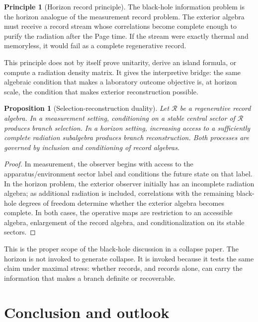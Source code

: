 \documentclass[11pt]{article}
\numberwithin{equation}{section}
\newtheorem{proposition}[theorem]{Proposition}
\theoremstyle{definition}
\newtheorem{principle}[theorem]{Principle}
\theoremstyle{remark}
\newcommand{\Ralg}{\mathcal R}
\begin{document}
\begin{principle}[Horizon record principle]
\label{principle:horizon-record}
The black-hole information problem is the horizon analogue of the measurement record problem.  The exterior algebra must receive a record stream whose correlations become complete enough to purify the radiation after the Page time.  If the stream were exactly thermal and memoryless, it would fail as a complete regenerative record.
\end{principle}

This principle does not by itself prove unitarity, derive an island formula, or compute a radiation density matrix.  It gives the interpretive bridge: the same algebraic condition that makes a laboratory outcome objective is, at horizon scale, the condition that makes exterior reconstruction possible.

\begin{proposition}[Selection-reconstruction duality]
\label{prop:selection-reconstruction}
Let \(\Ralg\) be a regenerative record algebra.  In a measurement setting, conditioning on a stable central sector of \(\Ralg\) produces branch selection.  In a horizon setting, increasing access to a sufficiently complete radiation subalgebra produces branch reconstruction.  Both processes are governed by inclusion and conditioning of record algebras.
\end{proposition}

\begin{proof}
In measurement, the observer begins with access to the apparatus/environment sector label and conditions the future state on that label.  In the horizon problem, the exterior observer initially has an incomplete radiation algebra; as additional radiation is included, correlations with the remaining black-hole degrees of freedom determine whether the exterior algebra becomes complete.  In both cases, the operative maps are restriction to an accessible algebra, enlargement of the record algebra, and conditionalization on its stable sectors.
\end{proof}

This is the proper scope of the black-hole discussion in a collapse paper.  The horizon is not invoked to generate collapse.  It is invoked because it tests the same claim under maximal stress: whether records, and records alone, can carry the information that makes a branch definite or recoverable.

\section{Conclusion and outlook}
\label{sec:outlook}
\end{document}
